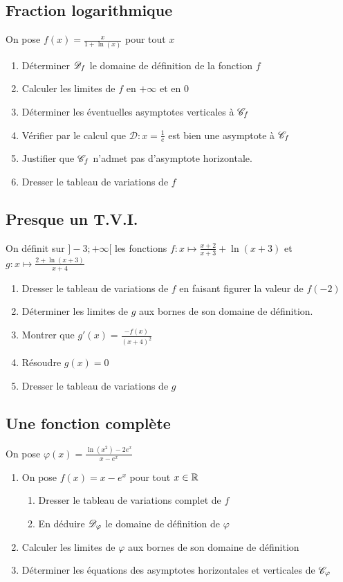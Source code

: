 \documentclass[oneside,12pt]{book}          %
\begin{document}
\subsection{Fraction logarithmique}
On pose $f(x)=\frac{x}{1+\ln(x)}$ pour tout $x$
\begin{enumerate}
    \item Déterminer ${\mathscr{D}}_f$ le domaine de définition de la fonction $f$
    \item Calculer les limites de $f$ en $+\infty$ et en $0$
    \item Déterminer les éventuelles asymptotes verticales à ${\mathscr{C}}_f$
    \item Vérifier par le calcul que $\mathcal{D}:x=\frac{1}{e}$ est bien une asymptote à ${\mathscr{C}}_f$
    \item Justifier que ${\mathscr{C}}_f$ n'admet pas d'asymptote horizontale.
    \item Dresser le tableau de variations de $f$
\end{enumerate}



\subsection{Presque un T.V.I.}
On définit sur $]-3; +\infty[$ les fonctions $f:x\mapsto \frac{x+2}{x+3}+\ln(x+3)$ et $g : x \mapsto \frac{2 + \ln(x + 3)}{x + 4}$
\begin{enumerate}
    \item Dresser le tableau de variations de $f$ en faisant figurer la valeur de $f(-2)$
    \item Déterminer les limites de $g$ aux bornes de son domaine de définition.
    \item Montrer que $g'(x) = \frac{-f(x)}{(x + 4)^2}$
    \item Résoudre $g(x)=0$
    \item Dresser le tableau de variations de $g$
\end{enumerate}



\subsection{Une fonction complète}
On pose $\varphi(x)=\frac{\ln(x^2)-2e^x}{x-e^x}$
\begin{enumerate}
    \item On pose $f(x)=x-e^x$ pour tout ${x\in\mathbb R}$
    \begin{enumerate}
        \item Dresser le tableau de variations complet de $f$
        \item En déduire ${\mathscr{D}}_{\varphi}$ le domaine de définition de $\varphi$
    \end{enumerate}
    \item Calculer les limites de $\varphi$ aux bornes de son domaine de définition
    \item Déterminer les équations des asymptotes horizontales et verticales de ${\mathscr{C}}_\varphi$
\end{enumerate}
\end{document}

